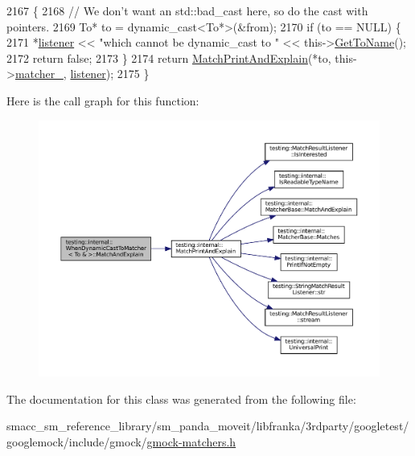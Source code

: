 \begin{DoxyCode}
2167                                                                         \{
2168     \textcolor{comment}{// We don't want an std::bad\_cast here, so do the cast with pointers.}
2169     To* to = \textcolor{keyword}{dynamic\_cast<}To*\textcolor{keyword}{>}(&from);
2170     \textcolor{keywordflow}{if} (to == NULL) \{
2171       *\hyperlink{namespaceinteractive__marker_a0e579ab555212bb5e2c9f8a675b7618a}{listener} << \textcolor{stringliteral}{"which cannot be dynamic\_cast to "} << this->\hyperlink{classtesting_1_1internal_1_1WhenDynamicCastToMatcherBase_a5950142a073ce7a1931848a958c88962}{GetToName}();
2172       \textcolor{keywordflow}{return} \textcolor{keyword}{false};
2173     \}
2174     \textcolor{keywordflow}{return} \hyperlink{namespacetesting_1_1internal_a0821df2611d54c79bac990719ad8a2dd}{MatchPrintAndExplain}(*to, this->\hyperlink{classtesting_1_1internal_1_1WhenDynamicCastToMatcherBase_a40d697407c960bee8fe3b125f5ac8730}{matcher\_}, 
      \hyperlink{namespaceinteractive__marker_a0e579ab555212bb5e2c9f8a675b7618a}{listener});
2175   \}
\end{DoxyCode}
Here is the call graph for this function\+:
\nopagebreak
\begin{figure}[H]
\begin{center}
\leavevmode
\includegraphics[width=350pt]{classtesting_1_1internal_1_1WhenDynamicCastToMatcher_3_01To_01_6_01_4_a1eb76a60d0943519623f438b29f70a5f_cgraph}
\end{center}
\end{figure}


The documentation for this class was generated from the following file\+:\begin{DoxyCompactItemize}
\item 
smacc\+\_\+sm\+\_\+reference\+\_\+library/sm\+\_\+panda\+\_\+moveit/libfranka/3rdparty/googletest/googlemock/include/gmock/\hyperlink{gmock-matchers_8h}{gmock-\/matchers.\+h}\end{DoxyCompactItemize}
